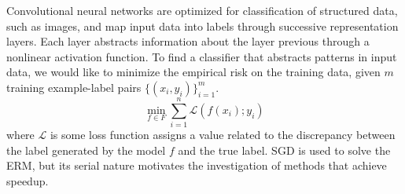 Convolutional neural networks are optimized for classification of structured data, such as images, and map input data into labels through successive representation layers.  Each layer abstracts information about the layer previous through a nonlinear activation function.  
To find a classifier that abstracts patterns in input data, we would like to minimize the empirical risk on the training data, given $m$ training example-label pairs $\{(x_i,y_i)\}_{i=1}^m$.
\begin{equation}
	\min_{f\in F}\sum_{i=1}^n \mathcal{L}(f(x_i);y_i)
	\label{eq:erm}
\end{equation}
where $\mathcal{L}$ is some loss function assigns a value related to the discrepancy between the label generated by the model $f$ and the true label.  SGD is used to solve the ERM, but its serial nature motivates the investigation of methods that achieve speedup.
